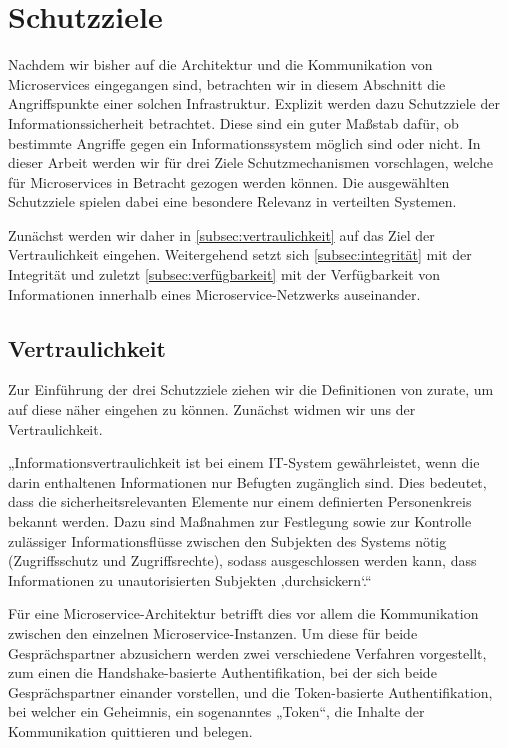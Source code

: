 \section{Schutzziele}
\label{sec:schutzziele}

Nachdem wir bisher auf die Architektur und die Kommunikation von Microservices eingegangen sind, betrachten wir in diesem Abschnitt die Angriffspunkte einer solchen Infrastruktur. Explizit werden dazu Schutzziele der Informationssicherheit betrachtet. Diese sind ein guter Maßstab dafür, ob bestimmte Angriffe gegen ein Informationssystem möglich sind oder nicht. In dieser Arbeit werden wir für drei Ziele Schutzmechanismen vorschlagen, welche für Microservices in Betracht gezogen werden können. Die ausgewählten Schutzziele spielen dabei eine besondere Relevanz in verteilten Systemen. 

Zunächst werden wir daher in \autoref{subsec:vertraulichkeit} auf das Ziel der Vertraulichkeit eingehen. Weitergehend setzt sich \autoref{subsec:integrität} mit der Integrität und zuletzt \autoref{subsec:verfügbarkeit} mit der Verfügbarkeit von Informationen innerhalb eines Microservice-Netzwerks auseinander.


\subsection{Vertraulichkeit}
\label{subsec:vertraulichkeit}

Zur Einführung der drei Schutzziele ziehen wir die Definitionen von \citeauthor{Bedner+10} zurate, um auf diese näher eingehen zu können. Zunächst widmen wir uns der Vertraulichkeit.

„Informationsvertraulichkeit ist bei einem IT-System gewährleistet, wenn die darin enthaltenen Informationen nur Befugten zugänglich sind. Dies bedeutet, dass die sicherheitsrelevanten Elemente nur einem definierten Personenkreis bekannt werden. Dazu sind Maßnahmen zur Festlegung sowie zur Kontrolle zulässiger Informationsflüsse zwischen den Subjekten des Systems nötig (Zugriffsschutz und Zugriffsrechte), sodass ausgeschlossen werden kann, dass Informationen zu unautorisierten Subjekten ‚durchsickern‘.“ \cite{Bedner+10}

Für eine Microservice-Architektur betrifft dies vor allem die Kommunikation zwischen den einzelnen Microservice-Instanzen. Um diese für beide Gesprächspartner abzusichern werden zwei verschiedene Verfahren vorgestellt, zum einen die Handshake-basierte Authentifikation, bei der sich beide Gesprächspartner einander vorstellen, und die Token-basierte Authentifikation, bei welcher ein Geheimnis, ein sogenanntes „Token“, die Inhalte der Kommunikation quittieren und belegen.


